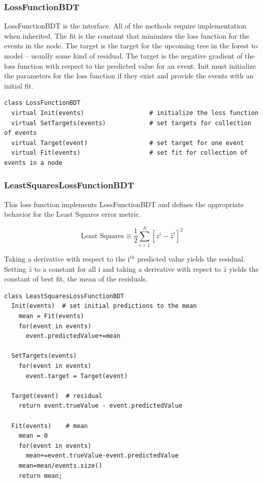 \documentclass[12pt]{article}
\begin{document}
\subsubsection{LossFunctionBDT}

LossFunctionBDT is the interface. All of the methods require implementation when inherited. The fit is the constant that minimizes the loss function for the events in the node. The target is the target for the upcoming tree in the forest to model -- usually some kind of residual. The target is the negative gradient of the loss function with respect to the predicted value for an event. Init must initialize the parameters for the loss function if they exist and provide the events with an initial fit.  

\begin{verbatim}
class LossFunctionBDT
  virtual Init(events)                  # initialize the loss function
  virtual SetTargets(events)            # set targets for collection of events
  virtual Target(event)                 # set target for one event
  virtual Fit(events)                   # set fit for collection of events in a node
\end{verbatim}

\subsubsection{LeastSquaresLossFunctionBDT}

This loss function implements LossFunctionBDT and defines the appropriate behavior for the Least Squares error metric.

\begin{equation}
\textrm{Least Squares} \equiv \frac{1}{2}\sum_{i=1}^{N} [z^i-\hat{z}^i]^2
\end{equation}

Taking a derivative with respect to the i$^{th}$ predicted value yields the residual. Setting $\hat{z}$ to a constant for all i and taking a derivative with repect to $\hat{z}$ yields the constant of best fit, the mean of the residuals.    

\begin{verbatim}
class LeastSquaresLossFunctionBDT
  Init(events)  # set initial predictions to the mean
    mean = Fit(events)
    for(event in events)
      event.predictedValue+=mean

  SetTargets(events)  
    for(event in events)  
      event.target = Target(event)

  Target(event)  # residual                 
    return event.trueValue - event.predictedValue

  Fit(events)    # mean                 
    mean = 0
    for(event in events)
      mean+=event.trueValue-event.predictedValue
    mean=mean/events.size()
    return mean;

\end{verbatim}
\end{document}
